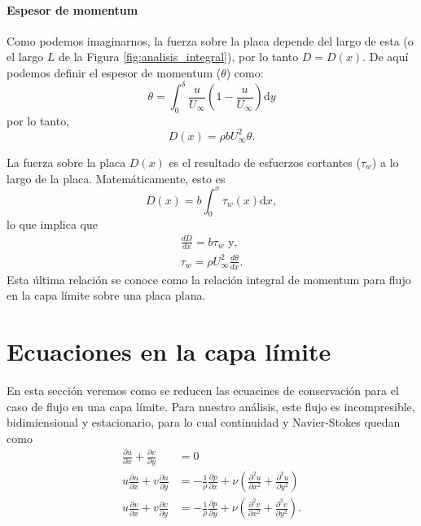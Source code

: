 \paragraph*{Espesor de momentum}
Como podemos imaginarnos, la fuerza sobre la placa depende del largo de esta (o el largo $L$ de la Figura \ref{fig:analisis_integral}), por lo tanto $D=D(x)$.
De aquí podemos definir el espesor de momentum ($\theta$) como:
%
\begin{equation}\label{eq:espesor_momentum}
\theta = \int_0^\delta \frac{u}{U_\infty}\left(1-\frac{u}{U_\infty}\right)\mathrm{d}y
\end{equation}
%
por lo tanto,
%
\begin{equation}
D(x) = \rho b U_\infty^2\theta.
\end{equation}

La fuerza sobre la placa $D(x)$ es el resultado de esfuerzos cortantes ($\tau_w$) a lo largo de la placa.
Matemáticamente, esto es
%
\begin{equation}
D(x) = b\int_0^x \tau_w(x)\mathrm{d}x,
\end{equation}
%
lo que implica que
%
\begin{align}
\frac{dD}{dx}=b\tau_w \text{ y, }\nonumber\\
\tau_w=\rho U_\infty^2 \frac{d\theta}{dx}.
\end{align}
%
Esta última relación se conoce como la relación integral de momentum para flujo en la capa límite sobre una placa plana.

\section*{Ecuaciones en la capa límite}
En esta sección veremos como se reducen las ecuacines de conservación para el caso de flujo en una capa límite.
Para nuestro análisis, este flujo es incompresible, bidimiensional y estacionario, para lo cual continuidad y Navier-Stokes quedan como
%
\begin{align}\label{eq:NS_capa}
\frac{\partial u}{\partial x} + \frac{\partial v}{\partial y} &= 0 \nonumber\\
u\frac{\partial u}{\partial x} + v\frac{\partial u}{\partial y} &= -\frac{1}{\rho}\frac{\partial p}{\partial x} + \nu\left( \frac{\partial^2u}{\partial x^2} + \frac{\partial^2u}{\partial y^2}\right) \nonumber\\
u\frac{\partial v}{\partial x} + v\frac{\partial v}{\partial y} &= -\frac{1}{\rho}\frac{\partial p}{\partial y} + \nu\left( \frac{\partial^2v}{\partial x^2} + \frac{\partial^2v}{\partial y^2}\right).
\end{align}

